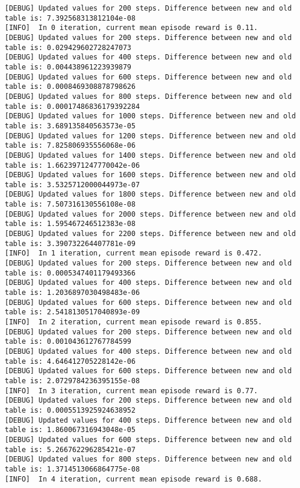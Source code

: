 \documentclass[11pt]{article}
\begin{document}
    \begin{Verbatim}[commandchars=\\\{\}]
[DEBUG]	Updated values for 200 steps. Difference between new and old table is: 7.392568313812104e-08
[INFO]	In 0 iteration, current mean episode reward is 0.11.
[DEBUG]	Updated values for 200 steps. Difference between new and old table is: 0.029429602728247073
[DEBUG]	Updated values for 400 steps. Difference between new and old table is: 0.004438961223939879
[DEBUG]	Updated values for 600 steps. Difference between new and old table is: 0.0008469308878798626
[DEBUG]	Updated values for 800 steps. Difference between new and old table is: 0.00017486836179392284
[DEBUG]	Updated values for 1000 steps. Difference between new and old table is: 3.689135840563573e-05
[DEBUG]	Updated values for 1200 steps. Difference between new and old table is: 7.825806935556068e-06
[DEBUG]	Updated values for 1400 steps. Difference between new and old table is: 1.6623971247770042e-06
[DEBUG]	Updated values for 1600 steps. Difference between new and old table is: 3.5325712000044973e-07
[DEBUG]	Updated values for 1800 steps. Difference between new and old table is: 7.507316130556108e-08
[DEBUG]	Updated values for 2000 steps. Difference between new and old table is: 1.595467246512383e-08
[DEBUG]	Updated values for 2200 steps. Difference between new and old table is: 3.390732264407781e-09
[INFO]	In 1 iteration, current mean episode reward is 0.472.
[DEBUG]	Updated values for 200 steps. Difference between new and old table is: 0.0005347401179493366
[DEBUG]	Updated values for 400 steps. Difference between new and old table is: 1.2036897030498483e-06
[DEBUG]	Updated values for 600 steps. Difference between new and old table is: 2.5418130517040893e-09
[INFO]	In 2 iteration, current mean episode reward is 0.855.
[DEBUG]	Updated values for 200 steps. Difference between new and old table is: 0.001043612767784599
[DEBUG]	Updated values for 400 steps. Difference between new and old table is: 4.646412705228142e-06
[DEBUG]	Updated values for 600 steps. Difference between new and old table is: 2.0729784236395155e-08
[INFO]	In 3 iteration, current mean episode reward is 0.77.
[DEBUG]	Updated values for 200 steps. Difference between new and old table is: 0.0005513925924638952
[DEBUG]	Updated values for 400 steps. Difference between new and old table is: 1.860067316943048e-05
[DEBUG]	Updated values for 600 steps. Difference between new and old table is: 5.266762296285421e-07
[DEBUG]	Updated values for 800 steps. Difference between new and old table is: 1.3714513066864775e-08
[INFO]	In 4 iteration, current mean episode reward is 0.688.

\end{Verbatim}
\end{document}
